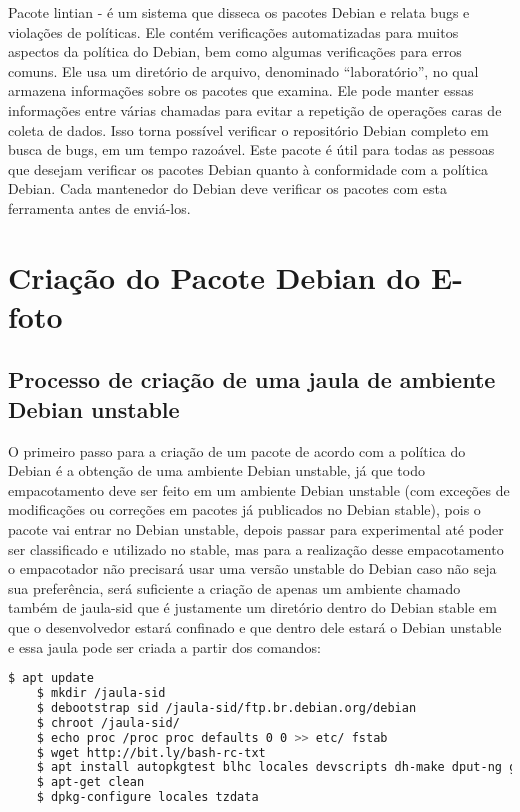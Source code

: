 Pacote lintian - é um sistema que disseca os pacotes Debian e relata bugs e violações de políticas. Ele contém verificações automatizadas para muitos aspectos da política do Debian, bem como algumas verificações para erros comuns. Ele usa um diretório de arquivo, denominado “laboratório”, no qual armazena informações sobre os pacotes que examina. Ele pode manter essas informações entre várias chamadas para evitar a repetição de operações caras de coleta de dados. Isso torna possível verificar o repositório Debian completo em busca de bugs, em um tempo razoável. Este pacote é útil para todas as pessoas que desejam verificar os pacotes Debian quanto à conformidade com a política Debian. Cada mantenedor do Debian deve verificar os pacotes com esta ferramenta antes de enviá-los.

\section{Criação do Pacote Debian do E-foto}

\subsection{Processo de criação de uma jaula de ambiente Debian unstable}

O primeiro passo para a criação de um pacote de acordo com a política do Debian é a obtenção de uma ambiente Debian unstable, já que todo empacotamento deve ser feito em um ambiente Debian unstable (com exceções de modificações ou correções em pacotes já publicados no Debian stable), pois o pacote vai entrar no Debian unstable, depois passar para experimental até poder ser classificado e utilizado no stable, mas para a realização desse empacotamento o empacotador não precisará usar uma versão unstable do Debian caso não seja sua preferência, será suficiente a criação de apenas um ambiente chamado também de jaula-sid que é justamente um diretório dentro do Debian stable em que o desenvolvedor estará confinado e que dentro dele estará o Debian unstable e essa jaula pode ser criada a partir dos comandos: 

\begin{lstlisting}[language=bash]
	$ apt update
	$ mkdir /jaula-sid
	$ debootstrap sid /jaula-sid/ftp.br.debian.org/debian
	$ chroot /jaula-sid/
	$ echo proc /proc proc defaults 0 0 >> etc/ fstab
	$ wget http://bit.ly/bash-rc-txt
	$ apt install autopkgtest blhc locales devscripts dh-make dput-ng git-buildpackage mc quilt spell tardiff tree lintian
	$ apt-get clean
	$ dpkg-configure locales tzdata
\end{lstlisting}

